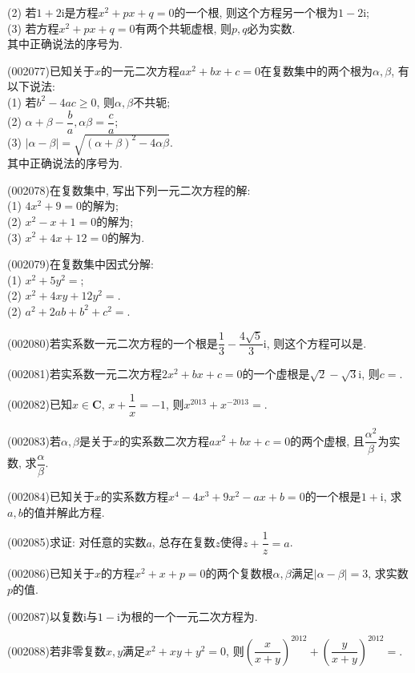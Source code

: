 (2) 若$1+2\mathrm{i}$是方程$x^2+px+q=0$的一个根, 则这个方程另一个根为$1-2\mathrm{i}$;\\ 
(3) 若方程$x^2+px+q=0$有两个共轭虚根, 则$p,q$必为实数.\\ 
其中正确说法的序号为.
\item (002077)已知关于$x$的一元二次方程$ax^2+bx+c=0$在复数集中的两个根为$\alpha, \beta$, 有以下说法:\\ 
(1) 若$b^2-4ac\geq 0$, 则$\alpha, \beta$不共轭;\\ 
(2) $\alpha+\beta-\dfrac{b}{a},\alpha\beta=\dfrac{c}{a}$;\\ 
(3) $|\alpha-\beta|=\sqrt{(\alpha+\beta)^2-4\alpha\beta}$.\\ 
其中正确说法的序号为.
\item (002078)在复数集中, 写出下列一元二次方程的解:\\ 
(1) $4x^2+9=0$的解为;\\ 
(2) $x^2-x+1=0$的解为;\\ 
(3) $x^2+4x+12=0$的解为.
\item (002079)在复数集中因式分解:\\ 
(1) $x^2+5y^2=$;\\ 
(2) $x^2+4xy+12y^2=$.\\ 
(2) $a^2+2ab+b^2+c^2=$.
\item (002080)若实系数一元二次方程的一个根是$\dfrac{1}{3}-\dfrac{4\sqrt{5}}{3}\mathrm{i}$, 则这个方程可以是.
\item (002081)若实系数一元二次方程$2x^2+bx+c=0$的一个虚根是$\sqrt{2}-\sqrt{3}\mathrm{i}$, 则$c=$.
\item (002082)已知$x\in \mathbf{C}$, $x+\dfrac{1}{x}=-1$, 则$x^{2013}+x^{-2013}=$.
\item (002083)若$\alpha,\beta$是关于$x$的实系数二次方程$ax^2+bx+c=0$的两个虚根, 且$\dfrac{\alpha^2}{\beta}$为实数, 求$\dfrac{\alpha}{\beta}$.
\item (002084)已知关于$x$的实系数方程$x^4-4x^3+9x^2-ax+b=0$的一个根是$1+\mathrm{i}$, 求$a,b$的值并解此方程.
\item (002085)求证: 对任意的实数$a$, 总存在复数$z$使得$z+\dfrac{1}{z}=a$.
\item (002086)已知关于$x$的方程$x^2+x+p=0$的两个复数根$\alpha,\beta$满足$|\alpha-\beta|=3$, 求实数$p$的值.
\item (002087)以复数$\mathrm{i}$与$1-\mathrm{i}$为根的一个一元二次方程为.
\item (002088)若非零复数$x,y$满足$x^2+xy+y^2=0$, 则$\left(\dfrac{x}{x+y}\right)^{2012}+\left(\dfrac{y}{x+y}\right)^{2012}=$.
